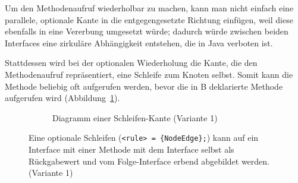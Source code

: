 \documentclass[../InterneDSLs.tex]{subfiles}
\begin{document}
Um den Methodenaufruf wiederholbar zu machen, kann man nicht einfach eine parallele, optionale Kante in die entgegengesetzte Richtung einfügen, weil diese ebenfalls in eine Vererbung umgesetzt würde; dadurch würde zwischen beiden Interfaces eine zirkuläre Abhängigkeit entstehen, die in Java verboten ist.

Stattdessen wird bei der optionalen Wiederholung die Kante, die den Methodenaufruf repräsentiert, eine Schleife zum Knoten selbst. Somit kann die Methode beliebig oft aufgerufen werden, bevor die in B deklarierte Methode aufgerufen wird (Abbildung~\ref{FIG:DiagramLoopNode}).
\begin{figure}[ht]
\centering
  \begin{subfigure}[c]{0.49\textwidth}
    \caption{Diagramm einer Schleifen-Kante (Variante 1)}
    \label{FIG:DiagramLoopNode}
  \end{subfigure}
  \begin{subfigure}[c]{0.49\textwidth}
    
  \end{subfigure}
  \caption[Abbildung einer optionalen Schleife (Variante 1)]{Eine optionale Schleifen (\texttt{<rule> = \{NodeEdge\};}) kann auf ein Interface mit einer Methode mit dem Interface selbst als Rückgabewert und vom Folge-Interface erbend abgebildet werden. (Variante 1)}
  \label{FIG:LoopNode}
\end{figure}
\end{document}
